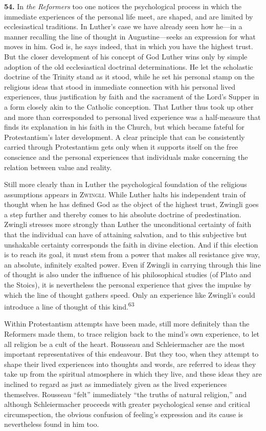 \documentclass[12pt,a4paper]{book}
\newcommand{\opage}[1]{\marginnote{\footnotesize\textit{[#1]}}}
\begin{document}
\medskip

\noindent\textbf{54.} In \emph{the Reformers} too one notices the psychological process in which the
immediate experiences of the personal life meet, are shaped, and are limited by ecclesiastical
traditions. In Luther's case we have already seen how he---in a manner recalling the line of thought in
Augustine---seeks an expression for what moves in him. God is, he says indeed, that in which you have
the highest trust. But the closer development of his concept of God Luther wins only by simple adoption
of the old ecclesiastical doctrinal determinations. He let the scholastic doctrine of the Trinity stand
as it stood, while he set his personal 
\opage{120}stamp on the religious ideas that stood in immediate connection
with his personal lived experiences, thus justification by faith and the sacrament of the Lord's Supper
in a form closely akin to the Catholic conception. That Luther thus took up other and more than
corresponded to personal lived experience was a half-measure that finds its explanation in his faith in
the Church, but which became fateful for Protestantism's later development. A clear principle that can
be consistently carried through Protestantism gets only when it supports itself on the free conscience
and the personal experiences that individuals make concerning the relation between value and reality.

Still more clearly than in Luther the psychological foundation of the religious assumptions appears in
\textsc{Zwingli}. While Luther halts his independent train of thought when he has defined God as the
object of the highest trust, Zwingli goes a step further and thereby comes to his absolute doctrine of
predestination. Zwingli stresses more strongly than Luther the unconditional certainty of faith that the
individual can have of attaining salvation, and to this subjective but unshakable certainty corresponds
the faith in divine election. And if this election is to reach its goal, it must stem from a power that
makes all resistance give way, an absolute, infinitely exalted power. Even if Zwingli in carrying through
this line of thought is also under the influence of his philosophical studies (of Plato and the Stoics),
it is nevertheless the personal experience that gives the impulse by which the line of thought gathers
speed. Only an experience like Zwingli's could introduce a line of thought of this
kind.\textsuperscript{63}

Within Protestantism attempts have been made, still more definitely than the Reformers made them, to
trace religion back to the mind's own experience, to let all religion be a cult of the heart. Rousseau and
Schleiermacher are the most important representatives of this endeavour. But they too, when they attempt
to shape their lived experiences into thoughts and words, are referred to ideas they take up from the
spiritual atmosphere in which they live, and these ideas they are inclined to regard as just as
immediately given as the lived experiences themselves. Rousseau ``felt'' immediately ``the truths of
natural religion,'' and although Schleiermacher proceeds with greater psychological sense and critical
circumspection, the obvious confusion of feeling's expression and its cause is nevertheless found in him
too.
\end{document}
